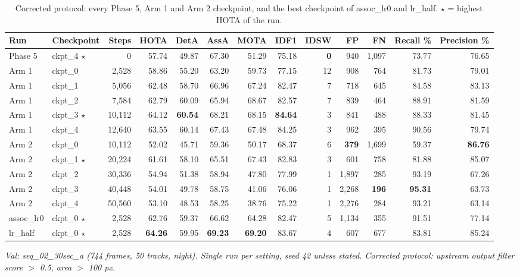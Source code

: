 \begin{table}[t]
\centering
\small
\caption{Corrected protocol: every Phase 5, Arm 1 and Arm 2 checkpoint, and the best checkpoint of assoc\_lr0 and lr\_half. $\star$ = highest HOTA of the run.}
\begin{tabular}{llrrrrrrrrrrr}
\toprule
Run & Checkpoint & Steps & HOTA & DetA & AssA & MOTA & IDF1 & IDSW & FP & FN & Recall \% & Precision \% \\
\midrule
Phase 5 & ckpt\_4 $\star$ & 0 & 57.74 & 49.87 & 67.30 & 51.29 & 75.18 & \textbf{0} & 940 & 1,097 & 73.77 & 76.65 \\
Arm 1 & ckpt\_0 & 2,528 & 58.86 & 55.20 & 63.20 & 59.73 & 77.15 & 12 & 908 & 764 & 81.73 & 79.01 \\
Arm 1 & ckpt\_1 & 5,056 & 62.48 & 58.70 & 66.96 & 67.24 & 82.47 & 7 & 718 & 645 & 84.58 & 83.13 \\
Arm 1 & ckpt\_2 & 7,584 & 62.79 & 60.09 & 65.94 & 68.67 & 82.57 & 7 & 839 & 464 & 88.91 & 81.59 \\
Arm 1 & ckpt\_3 $\star$ & 10,112 & 64.12 & \textbf{60.54} & 68.21 & 68.15 & \textbf{84.64} & 3 & 841 & 488 & 88.33 & 81.45 \\
Arm 1 & ckpt\_4 & 12,640 & 63.55 & 60.14 & 67.43 & 67.48 & 84.25 & 3 & 962 & 395 & 90.56 & 79.74 \\
Arm 2 & ckpt\_0 & 10,112 & 52.02 & 45.71 & 59.36 & 50.17 & 68.37 & 6 & \textbf{379} & 1,699 & 59.37 & \textbf{86.76} \\
Arm 2 & ckpt\_1 $\star$ & 20,224 & 61.61 & 58.10 & 65.51 & 67.43 & 82.83 & 3 & 601 & 758 & 81.88 & 85.07 \\
Arm 2 & ckpt\_2 & 30,336 & 54.94 & 51.38 & 58.94 & 47.80 & 77.99 & 1 & 1,897 & 285 & 93.19 & 67.26 \\
Arm 2 & ckpt\_3 & 40,448 & 54.01 & 49.78 & 58.75 & 41.06 & 76.06 & 1 & 2,268 & \textbf{196} & \textbf{95.31} & 63.73 \\
Arm 2 & ckpt\_4 & 50,560 & 53.10 & 48.53 & 58.25 & 38.76 & 75.22 & 1 & 2,276 & 284 & 93.21 & 63.14 \\
assoc\_lr0 & ckpt\_0 $\star$ & 2,528 & 62.76 & 59.37 & 66.62 & 64.28 & 82.47 & 5 & 1,134 & 355 & 91.51 & 77.14 \\
lr\_half & ckpt\_0 $\star$ & 2,528 & \textbf{64.26} & 59.95 & \textbf{69.23} & \textbf{69.20} & 83.67 & 4 & 607 & 677 & 83.81 & 85.24 \\
\bottomrule
\end{tabular}
\par\smallskip\footnotesize\emph{Val: seq\_02\_30sec\_a (744 frames, 50 tracks, night). Single run per setting, seed 42 unless stated. Corrected protocol: upstream output filter score $>$ 0.5, area $>$ 100 px.}
\end{table}
